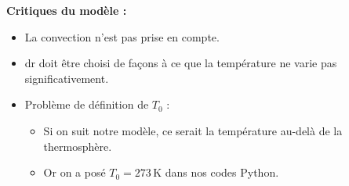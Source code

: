 \documentclass[a4paper,12pt]{article}
\begin{document}
\vspace{1cm}
\textbf{Critiques du modèle :}
\begin{itemize}
    \item La convection n’est pas prise en compte.
    \item dr doit être choisi de façons à ce que la température ne varie pas significativement.
    \item Problème de définition de $T_0$ :
    \begin{itemize}
        \item Si on suit notre modèle, ce serait la température au-delà de la thermosphère.
        \item Or on a posé $T_0 = 273\, \mathrm{K}$ dans nos codes Python. 
    
    \end{itemize}
\end{itemize}
\end{document}
